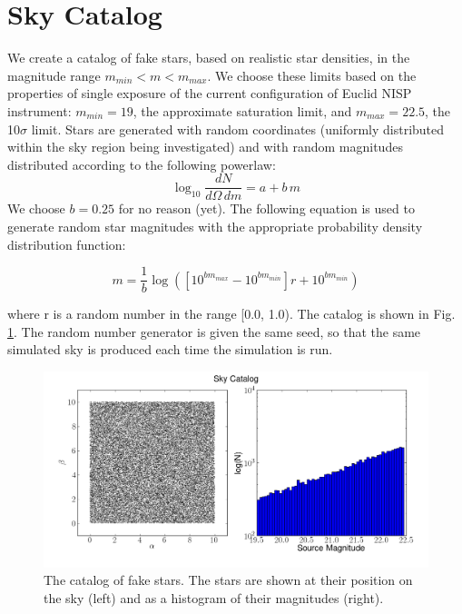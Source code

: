 \documentclass[manuscript]{aastex}
\begin{document}
\section{Sky Catalog}
We create a catalog of fake stars, based on realistic star densities, in the magnitude range $m_{min} < m < m_{max}$. We choose these limits based on the properties of single exposure of the current configuration of Euclid NISP instrument: $m_{min} = 19$, the approximate saturation limit, and $m_{max} = 22.5$, the 10$\sigma$ limit. Stars are generated with random coordinates (uniformly distributed within the sky region being investigated) and with random magnitudes distributed according to the following powerlaw:
\begin{displaymath}
\log_{10} \frac{dN}{d\Omega\,dm} = a + b\,m
\end{displaymath}
We choose $b = 0.25$ for no reason (yet).
The following equation is used to generate random star magnitudes with the appropriate probability density distribution function:

\begin{displaymath}
m = \frac{1}{b} \log{(\left[ 10^{b m_{max}} - 10^{b m_{min}} \right] r + 10^{b m_{min}})}
\end{displaymath}

\noindent{}where r is a random number in the range [0.0, 1.0). The catalog is shown in Fig. \ref{fig:sky}. The random number generator is given the same seed, so that the same simulated sky is produced each time the simulation is run.

\begin{figure}[ht]
\begin{center}
\includegraphics[width=\textwidth]{Catalog.png}
\end{center}
\caption{The catalog of fake stars. The stars are shown at their position on the sky (left) and as a histogram of their magnitudes (right).
\label{fig:sky}}
\end{figure}
\end{document}
